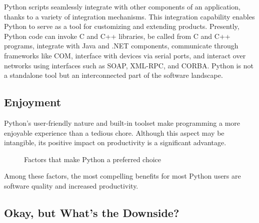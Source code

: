 \documentclass[12pt]{book}
\begin{document}
Python scripts seamlessly integrate with other components of an application, thanks to a variety of integration mechanisms. This integration capability enables Python to serve as a tool for customizing and extending products. Presently, Python code can invoke C and C++ libraries, be called from C and C++ programs, integrate with Java and .NET components, communicate through frameworks like COM, interface with devices via serial ports, and interact over networks using interfaces such as SOAP, XML-RPC, and CORBA. Python is not a standalone tool but an interconnected part of the software landscape.

\subsection{Enjoyment}

Python's user-friendly nature and built-in toolset make programming a more enjoyable experience than a tedious chore. Although this aspect may be intangible, its positive impact on productivity is a significant advantage.

\begin{figure}[ht]
\centering
{}
\caption{Factors that make Python a preferred choice}
\label{fig:python_factors}
\end{figure}

Among these factors, the most compelling benefits for most Python users are software quality and increased productivity.

\subsection{Okay, but What's the Downside?}
\end{document}

